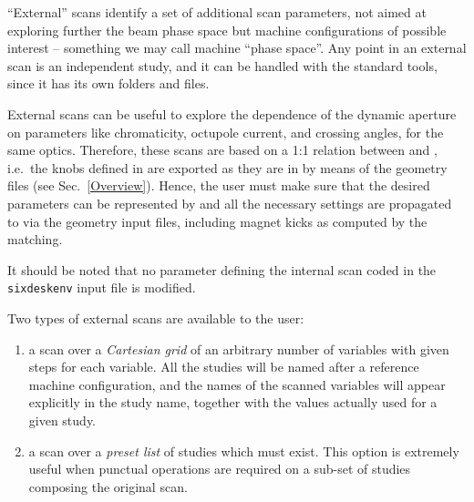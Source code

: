 ``External'' scans identify a set of additional scan parameters, not aimed at
exploring further the beam phase space but machine configurations of possible
interest -- something we may call machine ``phase space''. Any point in
an external scan is an independent \SIXDESK{} study, and it can be handled
with the standard tools, since it has its own folders and files.

External scans can be useful to explore the dependence of the dynamic
aperture on parameters like chromaticity, octupole current, and crossing
angles, for the same optics. Therefore,
these scans are based on a 1:1 relation between \MADX{} and
\SIXTRACK{}, i.e.~the knobs defined in \MADX{} are exported as they
are in \SIXTRACK{} by means of the geometry files (see Sec.~\ref{Overview}).
Hence, the user must make sure that the desired parameters can be
represented by \MADX{} and all the necessary settings are propagated
to \SIXTRACK{} via the geometry input files,
including magnet kicks as computed by the \MADX{} matching.

It should be noted that no parameter defining the internal scan
coded in the \texttt{sixdeskenv} input file is modified.

Two types of external scans are available to the user:
\begin{enumerate}
\item a scan over a \emph{Cartesian grid} of an arbitrary number
  of variables with given steps for each variable. All the studies
  will be named after a reference machine configuration, and the names
  of the scanned variables will appear explicitly in the study name,
  together with the values actually used for a given study.
\item a scan over a \emph{preset list} of studies which must exist.
  This option is extremely useful when punctual operations are
  required on a sub-set of studies composing the original scan.
\end{enumerate}

